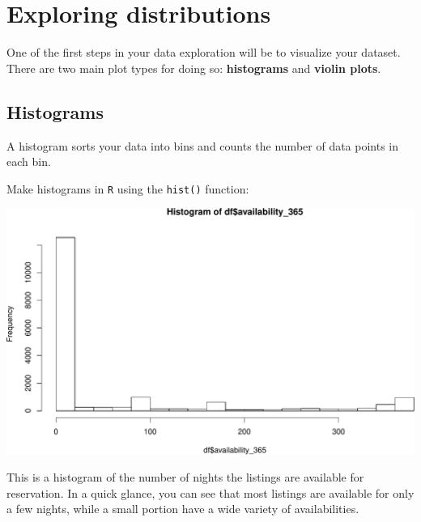 \documentclass[
]{book}
\newenvironment{Shaded}{\begin{snugshade}}{\end{snugshade}}
\newcommand{\FunctionTok}[1]{\textcolor[rgb]{0.00,0.00,0.00}{#1}}
\newcommand{\NormalTok}[1]{#1}
\newcommand{\SpecialCharTok}[1]{\textcolor[rgb]{0.00,0.00,0.00}{#1}}
\begin{document}
\hypertarget{exploring-distributions}{%
\section*{Exploring distributions}\label{exploring-distributions}}

One of the first steps in your data exploration will be to visualize your dataset. There are two main plot types for doing so: \textbf{histograms} and \textbf{violin plots}.

\hypertarget{histograms}{%
\subsection*{Histograms}\label{histograms}}

A histogram sorts your data into bins and counts the number of data points in each bin.

Make histograms in \texttt{R} using the \texttt{hist()} function:

\begin{Shaded}
\end{Shaded}

\includegraphics{figures/unnamed-chunk-211-1.pdf}

This is a histogram of the number of nights the listings are available for reservation. In a quick glance, you can see that most listings are available for only a few nights, while a small portion have a wide variety of availabilities.
\end{document}
